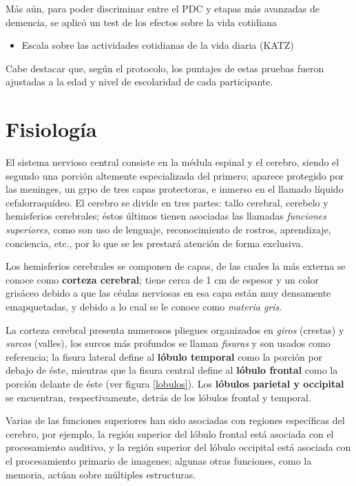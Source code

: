 Más aún, para poder discriminar entre el PDC y etapas más avanzadas de demencia, se aplicó un
test de los efectos sobre la vida cotidiana
%
\begin{itemize}
\item {Escala sobre las actividades cotidianas de la vida diaria (KATZ)} \cite{Roumec14}
\end{itemize}

Cabe destacar que, según el protocolo, los puntajes de estas pruebas fueron ajustadas a la edad y 
nivel de escolaridad de cada participante.


\section{Fisiología}

El sistema nervioso central consiste en la médula espinal y el cerebro, siendo el segundo una
porción altemente especializada del primero; aparece protegido por las meninges, un grpo de tres 
capas protectoras, e inmerso en el llamado líquido cefalorraquídeo.
El cerebro se divide en tres partes: tallo cerebral, cerebelo y hemisferios cerebrales; éstos 
últimos tienen asociadas las llamadas \textit{funciones superiores}, como son uso de lenguaje,
reconocimiento de rostros, aprendizaje, conciencia, etc., por lo que se les prestará atención de 
forma exclusiva.

Los hemisferios cerebrales se componen de capas, de las cuales la más externa se conoce como
\textbf{corteza cerebral}; tiene cerca de 1 cm de espesor y un color grisáceo debido a que las 
céulas nerviosas en esa capa están muy densamente emapquetadas, y debido a lo cual se le conoce
como \textit{materia gris}.

La corteza cerebral presenta numerosos pliegues organizados en \textit{giros} (crestas) y
\textit{surcos} (valles), los surcos más profundos se llaman \textit{fisuras} y son usados como 
referencia; la fisura lateral define al \textbf{lóbulo temporal} como la porción por debajo de 
éste, mientras que la fisura central define al \textbf{lóbulo frontal} como la porción delante de 
éste (ver figura \ref{lobulos}). Los \textbf{lóbulos parietal y occipital} se encuentran, 
respectivamente, detrás de los lóbulos frontal y temporal.

Varias de las funciones superiores han sido asociadas con regiones específicas del cerebro, por
ejemplo, la región superior del lóbulo frontal está asociada con el procesamiento auditivo, y la
región superior del lóbulo occipital está asociada con el procesamiento primario de imagenes;
algunas otras funciones, como la memoria, actúan sobre múltiples estructuras.

